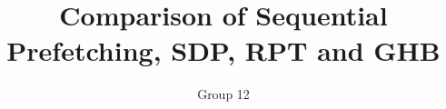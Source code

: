 \documentclass[journal]{IEEEtran}
\begin{document}
\title{Comparison of Sequential Prefetching, SDP, RPT and GHB}


\author{Group 12}

\maketitle










%
%




\end{document}
